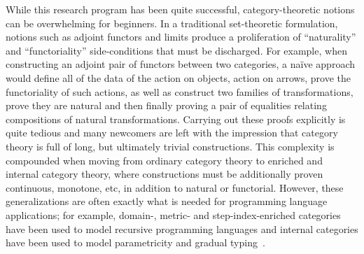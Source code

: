 \documentclass{llncs}
\begin{document}
While this research program has been quite successful,
category-theoretic notions can be overwhelming for beginners.
%
In a traditional set-theoretic formulation, notions such as adjoint
functors and limits produce a proliferation of ``naturality'' and
``functoriality'' side-conditions that must be discharged.
%
For example, when constructing an adjoint pair of
functors between two categories, a na\"ive approach would define all of
the data of the action on objects, action on arrows, prove the
functoriality of such actions, as well as construct two families of
transformations, prove they are natural and then finally proving a pair
of equalities relating compositions of natural transformations.
%
Carrying out these proofs explicitly is quite tedious and many
newcomers are left with the impression that category theory is full of
long, but ultimately trivial constructions.
%
This complexity is compounded when moving from ordinary category
theory to enriched and internal category theory, where constructions
must be additionally proven continuous, monotone, etc, in addition to
natural or functorial.
%
However, these generalizations are often exactly what is needed for programming
language applications; for example, domain-, metric- and
step-index-enriched categories have been used to model recursive
programming languages and internal categories have been used to model
parametricity and gradual
typing~\cite{wand197913,topos-of-trees,reflexive-graphs,double-cats-gradual-typing}.
\end{document}

